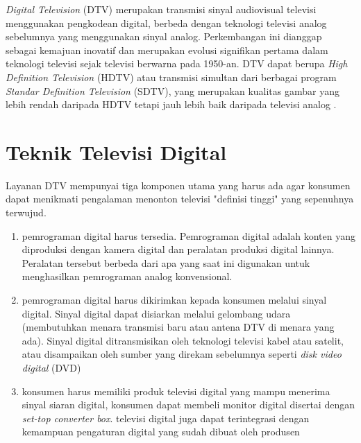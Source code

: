 \textit{Digital Television} (DTV) merupakan transmisi sinyal audiovisual televisi menggunakan pengkodean digital, berbeda dengan teknologi televisi analog sebelumnya yang menggunakan sinyal analog. Perkembangan ini dianggap sebagai kemajuan inovatif dan merupakan evolusi signifikan pertama dalam teknologi televisi sejak televisi berwarna pada 1950-an. DTV dapat berupa \textit{High Definition Television} (HDTV) atau transmisi simultan dari berbagai program \textit{Standar Definition Television} (SDTV), yang merupakan kualitas gambar yang lebih rendah daripada HDTV tetapi jauh lebih baik daripada televisi analog \citep{Kruger2002}.

\section{Teknik Televisi Digital}
\hspace{1,2cm}Layanan DTV mempunyai tiga komponen utama yang harus ada agar konsumen dapat menikmati pengalaman menonton televisi "definisi tinggi" yang sepenuhnya terwujud.

\begin{enumerate}
	\item pemrograman digital harus tersedia. Pemrograman digital adalah konten yang diproduksi dengan kamera digital dan peralatan produksi digital lainnya. Peralatan tersebut berbeda dari apa yang saat ini digunakan untuk menghasilkan pemrograman analog konvensional.
	\item pemrograman digital harus dikirimkan kepada konsumen melalui sinyal digital. Sinyal digital dapat disiarkan melalui gelombang udara (membutuhkan menara transmisi baru atau antena DTV di menara yang ada). Sinyal digital ditransmisikan oleh teknologi televisi kabel atau satelit, atau disampaikan oleh sumber yang direkam sebelumnya seperti \textit{disk video digital} (DVD)
	\item konsumen harus memiliki produk televisi digital yang mampu menerima sinyal siaran digital, konsumen dapat membeli monitor digital disertai dengan \textit{set-top converter box}. televisi digital juga dapat terintegrasi dengan kemampuan pengaturan digital yang sudah dibuat oleh produsen \citep{Kruger2002}
\end{enumerate}

